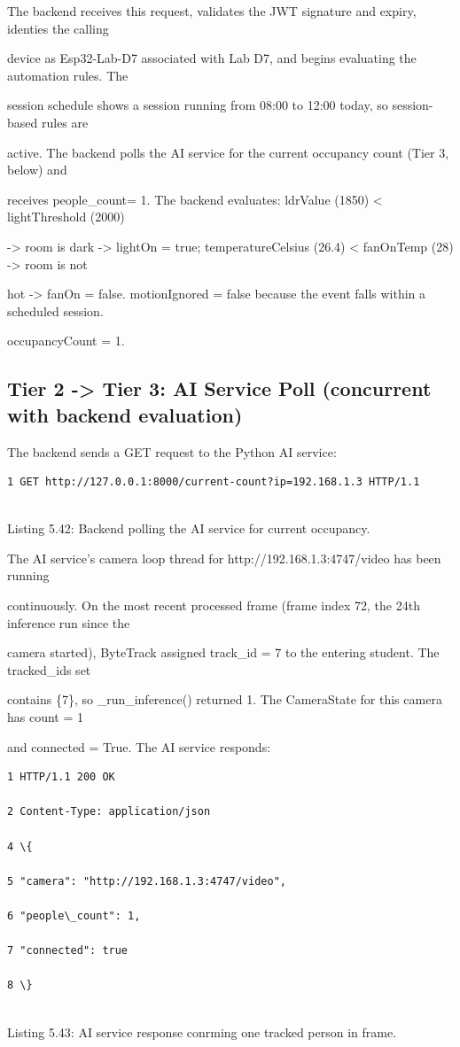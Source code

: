 The backend receives this request, validates the JWT signature and expiry, identies the calling

device as Esp32-Lab-D7 associated with Lab D7, and begins evaluating the automation rules. The

session schedule shows a session running from 08:00 to 12:00 today, so session-based rules are

active. The backend polls the AI service for the current occupancy count (Tier 3, below) and

receives people\_count= 1. The backend evaluates: ldrValue (1850) < lightThreshold (2000)

-> room is dark -> lightOn = true; temperatureCelsius (26.4) < fanOnTemp (28) -> room is not

hot -> fanOn = false. motionIgnored = false because the event falls within a scheduled session.

occupancyCount = 1.


\subsection{Tier 2 -> Tier 3: AI Service Poll (concurrent with backend evaluation)}
The backend sends a GET request to the Python AI service:

\begin{listingbox}
	\begin{verbatim}
1 GET http://127.0.0.1:8000/current-count?ip=192.168.1.3 HTTP/1.1


\end{verbatim}
\end{listingbox}
Listing 5.42: Backend polling the AI service for current occupancy.

The AI service's camera loop thread for http://192.168.1.3:4747/video has been running

continuously. On the most recent processed frame (frame index 72, the 24th inference run since the

camera started), ByteTrack assigned track\_id = 7 to the entering student. The tracked\_ids set

contains \{7\}, so \_run\_inference() returned 1. The CameraState for this camera has count = 1

and connected = True. The AI service responds:

\begin{listingbox}
	\begin{verbatim}
1 HTTP/1.1 200 OK

2 Content-Type: application/json

4 \{

5 "camera": "http://192.168.1.3:4747/video",

6 "people\_count": 1,

7 "connected": true

8 \}


\end{verbatim}
\end{listingbox}
Listing 5.43: AI service response conrming one tracked person in frame.


